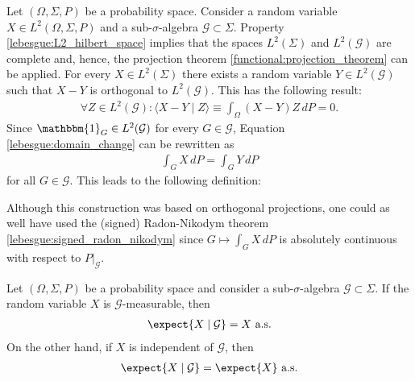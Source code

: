     Let $(\Omega,\Sigma,P)$ be a probability space. Consider a random variable $X\in L^2(\Omega,\Sigma,P)$ and a sub-$\sigma$-algebra $\mathcal{G}\subset\Sigma$. Property \ref{lebesgue:L2_hilbert_space} implies that the spaces $L^2(\Sigma)$ and $L^2(\mathcal{G})$ are complete and, hence, the projection theorem \ref{functional:projection_theorem} can be applied. For every $X\in L^2(\Sigma)$ there exists a random variable $Y\in L^2(\mathcal{G})$ such that $X-Y$ is orthogonal to $L^2(\mathcal{G})$. This has the following result:
    \begin{gather}
        \forall Z\in L^2(\mathcal{G}):\langle X-Y\mid Z \rangle\equiv\int_\Omega(X-Y)Z\,dP = 0.
    \end{gather}
    Since $\mathbbm{1}_G\in L^2(\mathcal{G})$ for every $G\in\mathcal{G}$, Equation \eqref{lebesgue:domain_change} can be rewritten as
    \begin{gather}
        \label{prob:conditional_expectation_condition}
        \int_GX\,dP = \int_GY\,dP
    \end{gather}
    for all $G\in\mathcal{G}$. This leads to the following definition:
    \begin{remark}
        Although this construction was based on orthogonal projections, one could as well have used the (signed) Radon-Nikodym theorem \ref{lebesgue:signed_radon_nikodym} since $G\mapsto\int_GX\,dP$ is absolutely continuous with respect to $P|_{\mathcal{G}}$.
    \end{remark}

    \begin{property}\label{prob:conditional_expectation_props}
        Let $(\Omega,\Sigma,P)$ be a probability space and consider a sub-$\sigma$-algebra $\mathcal{G}\subset\Sigma$. If the random variable $X$ is $\mathcal{G}$-measurable, then
        \begin{gather}
            \expect{X\mid\mathcal{G}} = X\text{ a.s.}
        \end{gather}
        On the other hand, if $X$ is independent of $\mathcal{G}$, then
        \begin{gather}
            \expect{X\mid\mathcal{G}} = \expect{X}\text{ a.s.}
        \end{gather}
    \end{property}

